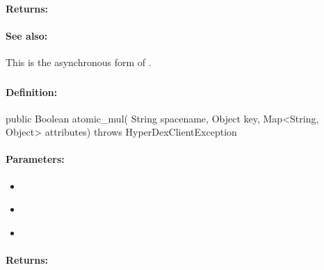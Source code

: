 \paragraph{Returns:}


\paragraph{See also:}  This is the asynchronous form of .

\pagebreak
\subsubsection{}
\label{api:java:atomic_mul}


\paragraph{Definition:}
\begin{javacode}
public Boolean atomic_mul(
        String spacename,
        Object key,
        Map<String, Object> attributes) throws HyperDexClientException
\end{javacode}

\paragraph{Parameters:}
\begin{itemize}[noitemsep]
\item {}\\

\item {}\\

\item {}\\

\end{itemize}

\paragraph{Returns:}


